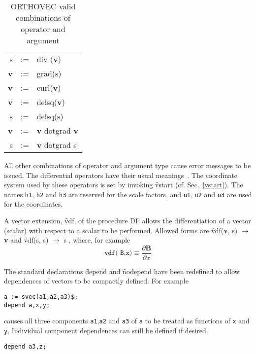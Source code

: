 \begin{table}[!tbp]
\begin{center}
\begin{tabular}{rcl}
s & := & div (\textbf{v})  \\
\textbf{v} & := & grad(s) \\
\textbf{v} & := & curl(\textbf{v})  \\
\textbf{v} & := & delsq(\textbf{v}) \\
 s  & := & delsq(s) \\
\textbf{v} & := & \textbf{v}  dotgrad \textbf{v}  \\
 s & := & \textbf{v}  dotgrad  s 
\end{tabular}
\end{center}
\caption{\textsc{ORTHOVEC} valid combinations of operator and argument}\label{vvecttable}
\end{table}

All other combinations of operator and argument type cause error
messages to be issued.  The differential operators have their usual
meanings~\cite{Spiegel:59}.  The coordinate system used by these operators is
set by invoking  \f{vstart} (cf. Sec.~\ref{vstart}).  The names \texttt{h1}, 
\texttt{h2}  and \texttt{h3} are
reserved for the scale factors, and \texttt{u1}, \texttt{u2} and \texttt{u3} are 
used for the coordinates.

A vector extension, \f{vdf}, of the \REDUCE procedure DF allows the 
differentiation of a vector (scalar) with respect to a scalar to be
performed.  Allowed forms are 
\hypertarget{operator:VDF}{}
\f{vdf}(\textbf{v}, s)  $\rightarrow$  \textbf{v}   and
\f{vdf}(s, s)  $\rightarrow$   s , 
where, for example
\begin{equation*}
\texttt{vdf( B,x)} \equiv \frac{\partial \textbf{B}}{\partial x}
\end{equation*}

The standard \REDUCE declarations \f{depend} and \f{nodepend} have been redefined
to allow dependences of vectors to be compactly
defined.  For example  
\begin{verbatim}
a := svec(a1,a2,a3)$;
depend a,x,y;
\end{verbatim}
causes all three components \texttt{a1},\texttt{a2} and \texttt{a3} of \texttt{a} 
to be treated as functions of \texttt{x} and \texttt{y}.
Individual component dependences can still be defined if desired.
\begin{verbatim}
depend a3,z;
\end{verbatim}

